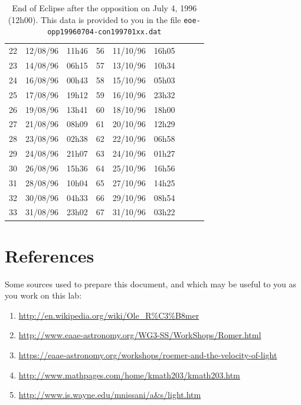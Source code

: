 \documentclass{tufte-handout}
\begin{document}
\begin{table}
\begin{tabular}{lll|lll|lll}
22 & 12/08/96 & 11h46 & 56 & 11/10/96 & 16h05 & & &\\
23 & 14/08/96 & 06h15 & 57 & 13/10/96 & 10h34 & & &\\
24 & 16/08/96 & 00h43 & 58 & 15/10/96 & 05h03 & & &\\
25 & 17/08/96 & 19h12 & 59 & 16/10/96 & 23h32 & & &\\
26 & 19/08/96 & 13h41 & 60 & 18/10/96 & 18h00 & & &\\
27 & 21/08/96 & 08h09 & 61 & 20/10/96 & 12h29 & & &\\
28 & 23/08/96 & 02h38 & 62 & 22/10/96 & 06h58 & & &\\
29 & 24/08/96 & 21h07 & 63 & 24/10/96 & 01h27 & & &\\
30 & 26/08/96 & 15h36 & 64 & 25/10/96 & 16h56 & & &\\
31 & 28/08/96 & 10h04 & 65 & 27/10/96 & 14h25 & & &\\
32 & 30/08/96 & 04h33 & 66 & 29/10/96 & 08h54 & & &\\
33 & 31/08/96 & 23h02 & 67 & 31/10/96 & 03h22 & & &\\
\end{tabular}
\caption{End of Eclipse after the opposition on July 4, 1996 (12h00). This data is provided to you in the file {\tt eoe-opp19960704-con199701xx.dat}}
\end{table}

\section{References}

Some sources used to prepare this document, and which may be useful to you as you work on this lab:

\begin{enumerate}
\item \url{http://en.wikipedia.org/wiki/Ole_R%C3%B8mer}
\item \url{http://www.eaae-astronomy.org/WG3-SS/WorkShops/Romer.html}
\item \url{https://eaae-astronomy.org/workshops/roemer-and-the-velocity-of-light}
\item \url{http://www.mathpages.com/home/kmath203/kmath203.htm}
\item \url{http://www.is.wayne.edu/mnissani/a&s/light.htm}
\end{enumerate}
\end{document}
